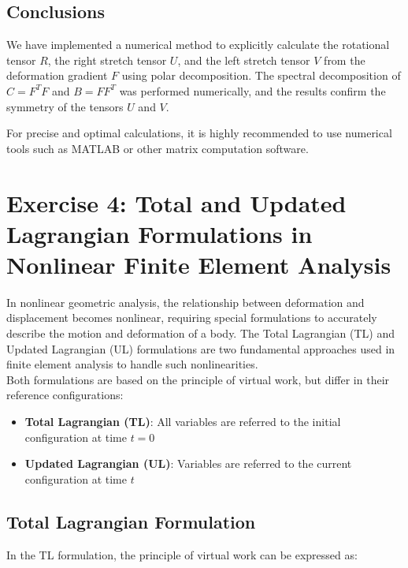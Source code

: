 \documentclass{article}
\begin{document}
\subsection{Conclusions}
We have implemented a numerical method to explicitly calculate the rotational tensor $ R $, the right stretch tensor $ U $, and the left stretch tensor $ V $ from the deformation gradient $ F $ using polar decomposition. The spectral decomposition of $ C = F^T F $ and $ B = F F^T $ was performed numerically, and the results confirm the symmetry of the tensors $ U $ and $ V $.

For precise and optimal calculations, it is highly recommended to use numerical tools such as MATLAB or other matrix computation software.









\section{Exercise 4: Total and Updated Lagrangian Formulations in Nonlinear Finite Element Analysis}

In nonlinear geometric analysis, the relationship between deformation and displacement becomes nonlinear, requiring special formulations to accurately describe the motion and deformation of a body. The Total Lagrangian (TL) and Updated Lagrangian (UL) formulations are two fundamental approaches used in finite element analysis to handle such nonlinearities.\\
Both formulations are based on the principle of virtual work, but differ in their reference configurations:

\begin{itemize}
    \item \textbf{Total Lagrangian (TL)}: All variables are referred to the initial configuration at time $t=0$
    \item \textbf{Updated Lagrangian (UL)}: Variables are referred to the current configuration at time $t$
\end{itemize}

\subsection{Total Lagrangian Formulation}

In the TL formulation, the principle of virtual work can be expressed as:
\end{document}
